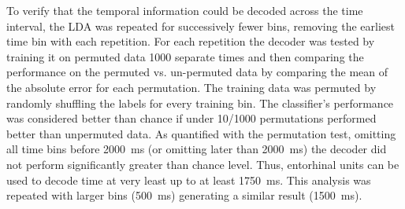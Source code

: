 \documentclass{apa}
\begin{document}
To verify that the temporal information could be decoded across the time
interval, the LDA was repeated for successively fewer bins, removing the
earliest time bin with each repetition.  For each repetition
the decoder was tested by training it on permuted data
1000 separate times and then comparing the performance on the permuted vs.
un-permuted data by comparing the mean of the absolute error for each
permutation.  The training data was permuted by randomly shuffling the labels for every training bin.  The classifier's performance was considered better than chance if under
10/1000 permutations performed better than unpermuted data. 
As quantified with the
permutation test, omitting all time bins before 2000~ms (or omitting later
than 2000~ms) the decoder did not perform significantly greater than chance
level.  Thus, entorhinal units can be used to decode time at very least up to at least 1750~ms.  This analysis was repeated with
larger bins (500~ms) generating a similar result (1500~ms).
\end{document}
